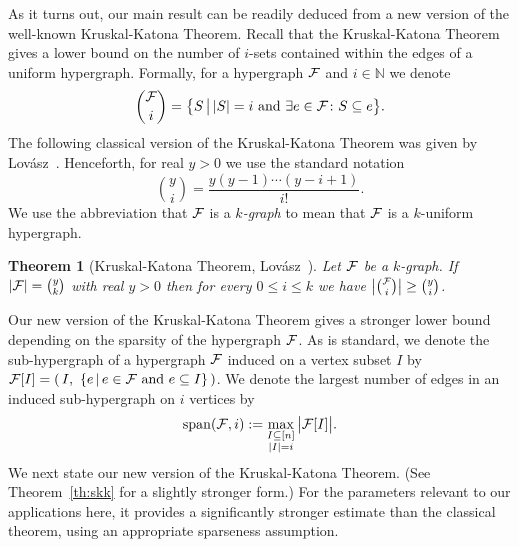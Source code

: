 \documentclass[11pt]{article}
\newtheorem{theo}{Theorem}[section]
\newtheorem{theo}{Theorem}[section]
\newcommand{\FF}{{\cal F}}
\renewcommand{\wp}{\mathrm{span}}
\newcommand{\sub}{\subseteq}
\newcommand{\N}{\mathbb{N}}
\DeclareMathOperator{\trace}{Tr}
\begin{document}
As it turns out, our main result can be readily deduced from a new version of the well-known Kruskal-Katona Theorem.
Recall that the Kruskal-Katona Theorem gives a lower bound on the number of $i$-sets contained within the edges of a uniform hypergraph. Formally, for a hypergraph $\FF$ and $i \in \N$ we denote 
$$\binom{\FF}{i} = \big\{S \,\big\vert\, |S|=i \text{ and } \exists e \in \FF \colon S \sub e \big\}.$$
The following classical version of the Kruskal-Katona Theorem 
was given by Lov\'asz~\cite{Lovasz}.
Henceforth, for real $y > 0$ we use the standard notation 
$$\binom{y}{i}=\frac{y(y-1)\cdots(y-i+1)}{i!} .$$ 
We use the abbreviation that $\FF$ is a \emph{$k$-graph} 
to mean that $\FF$ is a $k$-uniform hypergraph.

\begin{theo}[Kruskal-Katona Theorem, Lov\'asz~\cite{Lovasz}]%
	\label{th:kk}
	Let $\FF$ be a $k$-graph. 
	If $|\FF| = \binom{y}{k}$ with real $y > 0$
	then for every $0 \le i \le k$ we have $\big|\binom{\FF}{i}
\big| \ge \binom{y}{i}$.
\end{theo}

Our new version of the Kruskal-Katona Theorem gives a stronger lower bound depending on the sparsity %
of the hypergraph $\FF$.
As is standard, we denote the sub-hypergraph of a hypergraph $\FF$ induced on a vertex subset $I$ by
$\FF[I] =(\,I, \,\,\{e\,\vert\, e \in \FF \text{ and } e\sub I\}\,)$.
We denote the largest number of edges in an induced sub-hypergraph on $i$ vertices by
$$\wp(\FF,i) := \max_{\substack{I \sub [n]\\|I|=i}} \big|\FF[I]\big|.$$
%
We next state our new version of the Kruskal-Katona Theorem. 
(See Theorem~\ref{th:skk} for a slightly stronger form.)
For the parameters relevant to our applications here, it provides
a significantly stronger estimate than the classical theorem,
using an appropriate sparseness assumption.
\end{document}
